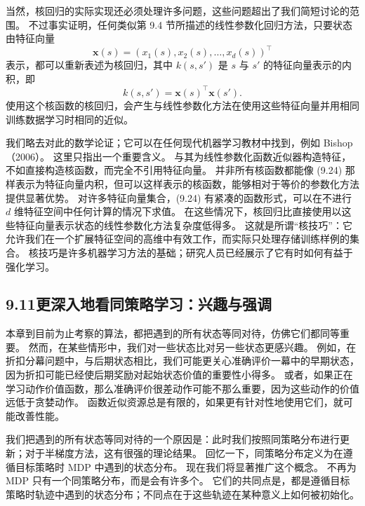 \documentclass[UTF8,12pt,a4paper,fontset=fandol]{ctexart}
\begin{document}
当然，核回归的实际实现还必须处理许多问题，这些问题超出了我们简短讨论的范围。
不过事实证明，任何类似第 9.4 节所描述的线性参数化回归方法，只要状态由特征向量
\[
\mathbf{x}(s)=(x_1(s),x_2(s),\ldots,x_d(s))^\top
\]
表示，都可以重新表述为核回归，其中 $k(s,s')$ 是 $s$ 与 $s'$ 的特征向量表示的内积，即
\begin{equation}
k(s,s')=\mathbf{x}(s)^\top\mathbf{x}(s').
\tag{9.24}
\end{equation}
使用这个核函数的核回归，会产生与线性参数化方法在使用这些特征向量并用相同训练数据学习时相同的近似。

我们略去对此的数学论证；它可以在任何现代机器学习教材中找到，例如 Bishop（2006）。
这里只指出一个重要含义。
与其为线性参数化函数近似器构造特征，不如直接构造核函数，而完全不引用特征向量。
并非所有核函数都能像 (9.24) 那样表示为特征向量内积，但可以这样表示的核函数，能够相对于等价的参数化方法提供显著优势。
对许多特征向量集合，(9.24) 有紧凑的函数形式，可以在不进行 $d$ 维特征空间中任何计算的情况下求值。
在这些情况下，核回归比直接使用以这些特征向量表示状态的线性参数化方法复杂度低得多。
这就是所谓“核技巧”：它允许我们在一个扩展特征空间的高维中有效工作，而实际只处理存储训练样例的集合。
核技巧是许多机器学习方法的基础；研究人员已经展示了它有时如何有益于强化学习。

\subsection*{9.11\quad 更深入地看同策略学习：兴趣与强调}

本章到目前为止考察的算法，都把遇到的所有状态等同对待，仿佛它们都同等重要。
然而，在某些情形中，我们对一些状态比对另一些状态更感兴趣。
例如，在折扣分幕问题中，与后期状态相比，我们可能更关心准确评价一幕中的早期状态，因为折扣可能已经使后期奖励对起始状态价值的重要性小得多。
或者，如果正在学习动作价值函数，那么准确评价很差动作可能不那么重要，因为这些动作的价值远低于贪婪动作。
函数近似资源总是有限的，如果更有针对性地使用它们，就可能改善性能。

我们把遇到的所有状态等同对待的一个原因是：此时我们按照同策略分布进行更新；对于半梯度方法，这有很强的理论结果。
回忆一下，同策略分布定义为在遵循目标策略时 MDP 中遇到的状态分布。
现在我们将显著推广这个概念。
不再为 MDP 只有一个同策略分布，而是会有许多个。
它们的共同点是，都是遵循目标策略时轨迹中遇到的状态分布；不同点在于这些轨迹在某种意义上如何被初始化。
\end{document}

